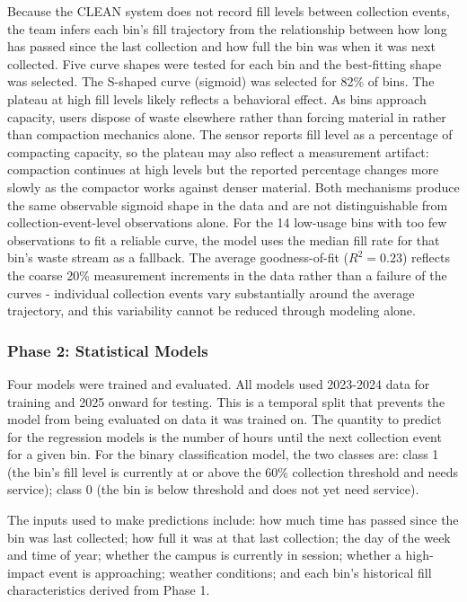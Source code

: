 \documentclass[11pt]{article}
\begin{document}
Because the CLEAN system does not record fill levels between collection events, the team
infers each bin's fill trajectory from the relationship between how long has passed since
the last collection and how full the bin was when it was next collected. Five curve shapes
were tested for each bin and the best-fitting shape was selected. The S-shaped curve
(sigmoid) was selected for 82\% of bins. The plateau at high fill levels likely reflects a behavioral effect. As bins approach capacity, users dispose of waste elsewhere rather than forcing material in rather than compaction mechanics alone. The sensor reports fill level as a percentage of compacting capacity, so the plateau may also reflect a measurement artifact: compaction continues at high levels but the reported percentage changes more slowly as the compactor works against denser material. Both mechanisms produce the same observable sigmoid shape in the data and are not distinguishable from collection-event-level observations alone.
For the 14 low-usage bins with too few observations to fit a reliable curve, the model
uses the median fill rate for that bin's waste stream as a fallback. The average
goodness-of-fit ($R^2 = 0.23$) reflects the coarse 20\% measurement increments in the
data rather than a failure of the curves - individual collection events vary substantially
around the average trajectory, and this variability cannot be reduced through modeling
alone.

\subsubsection*{Phase 2: Statistical Models}

Four models were trained and evaluated. All models used 2023-2024 data for training and
2025 onward for testing. This is a temporal split that prevents the model from being evaluated
on data it was trained on. The quantity to predict for the regression models is the number of
hours until the next collection event for a given bin. For the binary classification
model, the two classes are: class 1 (the bin's fill level is currently at or above the
60\% collection threshold and needs service); class 0 (the bin is below threshold and does
not yet need service).

The inputs used to make predictions include: how much time has passed since the bin was
last collected; how full it was at that last collection; the day of the week and time of
year; whether the campus is currently in session; whether a high-impact event is
approaching; weather conditions; and each bin's historical fill characteristics derived
from Phase 1.
\end{document}
